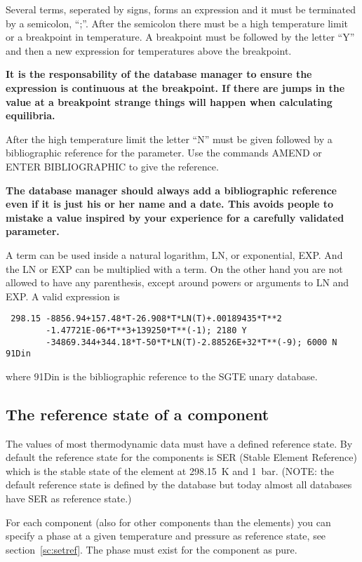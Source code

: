 \documentclass[11pt]{article}
\begin{document}
Several terms, seperated by signs, forms an expression and it must be
terminated by a semicolon, ``;''.  After the semicolon there must be a
high temperature limit or a breakpoint in temperature.  A breakpoint
must be followed by the letter ``Y'' and then a new expression for
temperatures above the breakpoint.  

{\bf It is the responsability of the database manager to ensure the
  expression is continuous at the breakpoint.  If there are jumps in
  the value at a breakpoint strange things will happen when
  calculating equilibria.}

After the high temperature limit the letter ``N'' must be given
followed by a bibliographic reference for the parameter.  Use the
commands AMEND or ENTER BIBLIOGRAPHIC to give the reference.

{\bf The database manager should always add a bibliographic reference
  even if it is just his or her name and a date.  This avoids people
  to mistake a value inspired by your experience for a carefully
  validated parameter.}

A term can be used inside a natural logarithm, LN, or exponential,
EXP. And the LN or EXP can be multiplied with a term.  On the other
hand you are not allowed to have any parenthesis, except around powers
or arguments to LN and EXP.  A valid expression is

\begin{verbatim}
 298.15 -8856.94+157.48*T-26.908*T*LN(T)+.00189435*T**2
        -1.47721E-06*T**3+139250*T**(-1); 2180 Y 
        -34869.344+344.18*T-50*T*LN(T)-2.88526E+32*T**(-9); 6000 N 91Din
\end{verbatim}

where 91Din is the bibliographic reference to the SGTE unary database.

\subsection{The reference state of a component}\label{sc:refstate}

The values of most thermodynamic data must have a defined reference
state.  By default the reference state for the components is SER
(Stable Element Reference) which is the stable state of the element at
298.15~K and 1~bar.  (NOTE: the default reference state is defined by
the database but today almost all databases have SER as reference
state.)

For each component (also for other components than the elements) you
can specify a phase at a given temperature and pressure as reference
state, see section~\ref{sc:setref}.  The phase must exist for the
component as pure.
\end{document}
